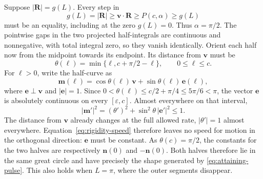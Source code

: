 \documentclass[12pt]{iopjournal}
\newcommand{\nvec}{\mathbf n}
\newcommand{\Rvec}{\mathbf R}
\newcommand{\vvec}{\mathbf v}
\begin{document}
Suppose $|\Rvec|=g(L)$. Every step in
\begin{equation}
 g(L)=|\Rvec|\ge\vvec\cdot\Rvec
 \ge P(c,\alpha)\ge g(L)
 \label{eq:equality-chain}
\end{equation}
must be an equality, including at the zero $g(L)=0$.
Thus $\alpha=\pi/2$. The pointwise gaps in the two projected
half-integrals are continuous and nonnegative, with total integral
zero, so they vanish identically. Orient each half now from the
midpoint towards its endpoint. Its distance from $\vvec$ must be
\begin{equation}
 \theta(\ell)=\min\{\ell,c+\pi/2-\ell\},\qquad 0\le\ell\le c.
 \label{eq:rigidity-angle}
\end{equation}
For $\ell>0$, write the half-curve as
\begin{equation}
 \mathbf m(\ell)=\cos\theta(\ell)\,\vvec
              +\sin\theta(\ell)\,\mathbf e(\ell),
\end{equation}
where $\mathbf e\perp\vvec$ and $|\mathbf e|=1$.
Since $0<\theta(\ell)\le c/2+\pi/4\le5\pi/6<\pi$, the vector
$\mathbf e$ is absolutely continuous on every $[\varepsilon,c]$.
Almost everywhere on that interval,
\begin{equation}
 |\mathbf m'|^2=(\theta')^2
       +\sin^2\theta\,|\mathbf e'|^2\le1.
 \label{eq:rigidity-speed}
\end{equation}
The distance from $\vvec$ already changes at the full allowed rate,
$|\theta'|=1$ almost everywhere. Equation~\eqref{eq:rigidity-speed}
therefore leaves no speed for motion in the orthogonal direction:
$\mathbf e$ must be constant. As $\theta(c)=\pi/2$, the constants
for the two halves are respectively
$\nvec(0)$ and $-\nvec(0)$. Both halves therefore lie in the same
great circle and have precisely the shape generated by
\eqref{eq:attaining-pulse}. This also holds when $L=\pi$, where the
outer segments disappear.
\end{document}
